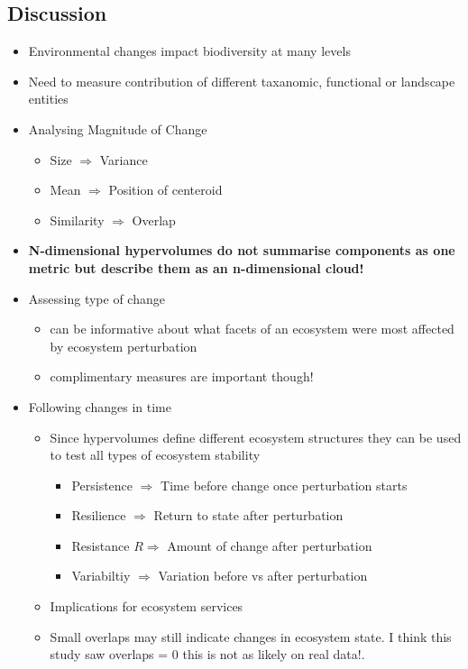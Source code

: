 \subsection*{Discussion} 
\begin{itemize}
	\item Environmental changes impact biodiversity at many levels
	\item Need to measure contribution of different taxanomic, functional or landscape entities
	
	\item Analysing Magnitude of Change
	\begin{itemize}
		\item Size $\Rightarrow$ Variance
		\item Mean $\Rightarrow$ Position of centeroid
		\item Similarity $\Rightarrow$ Overlap
	\end{itemize}

	\item \textbf{N-dimensional hypervolumes do not summarise components as one metric but describe them as an n-dimensional cloud!}
	
	\item Assessing type of change
	\begin{itemize}
		\item can be informative about what facets of an ecosystem were most affected by ecosystem perturbation
		\item complimentary measures are important though!
	\end{itemize}

	\item Following changes in time
	\begin{itemize}
		\item Since hypervolumes define different ecosystem structures they can be used to test all types of ecosystem stability
		\begin{itemize}
			\item Persistence $\Rightarrow$ Time before change once perturbation starts
			\item Resilience $\Rightarrow$ Return to state after perturbation
			\item Resistance $R\Rightarrow$ Amount of change after perturbation
			\item Variabiltiy $\Rightarrow$ Variation before vs after perturbation
		\end{itemize}
		\item Implications for ecosystem services
		\item Small overlaps may still indicate changes in ecosystem state. I think this study saw overlaps = 0 this is not as likely on real data!. 
	\end{itemize}


\end{itemize}
